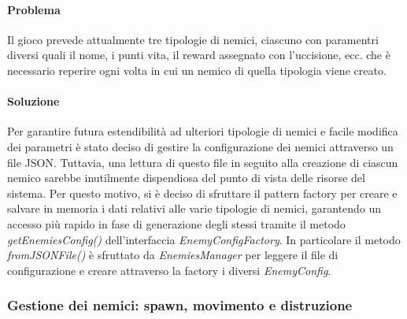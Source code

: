 \documentclass[a4paper,12pt]{report}
\begin{document}
\paragraph{Problema} Il gioco prevede attualmente tre tipologie di nemici, ciascuno con paramentri diversi quali il nome, i punti vita, il reward assegnato con l'uccisione, ecc. che è necessario reperire ogni volta in cui un nemico di quella tipologia viene creato. 
\paragraph{Soluzione} Per garantire futura estendibilità ad ulteriori tipologie di nemici e facile modifica dei parametri è stato deciso di gestire la configurazione dei nemici attraverso un file JSON. Tuttavia, una lettura di questo file in seguito alla creazione di ciascun nemico sarebbe inutilmente dispendiosa del punto di vista delle risorse del sistema. Per questo motivo, si è deciso di sfruttare il pattern factory per creare e salvare in memoria i dati relativi alle varie tipologie di nemici, garantendo un accesso più rapido in fase di generazione degli stessi tramite il metodo \textit{getEnemiesConfig()} dell'interfaccia \textit{EnemyConfigFactory}. In particolare il metodo \textit{fromJSONFile()} è sfruttato da \textit{EnemiesManager} per leggere il file di configurazione e creare attraverso la factory i diversi \textit{EnemyConfig}.

\subsubsection{Gestione dei nemici: spawn, movimento e distruzione}
\end{document}
